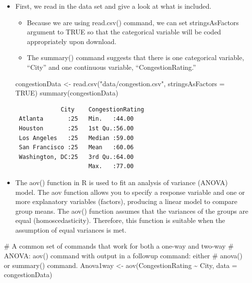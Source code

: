 \documentclass[
  letterpaper,
  DIV=11,
  numbers=noendperiod]{scrreprt}
\newenvironment{Shaded}{\begin{snugshade}}{\end{snugshade}}
\newcommand{\AttributeTok}[1]{\textcolor[rgb]{0.40,0.45,0.13}{#1}}
\newcommand{\CommentTok}[1]{\textcolor[rgb]{0.37,0.37,0.37}{#1}}
\newcommand{\ConstantTok}[1]{\textcolor[rgb]{0.56,0.35,0.01}{#1}}
\newcommand{\FunctionTok}[1]{\textcolor[rgb]{0.28,0.35,0.67}{#1}}
\newcommand{\NormalTok}[1]{\textcolor[rgb]{0.00,0.23,0.31}{#1}}
\newcommand{\OtherTok}[1]{\textcolor[rgb]{0.00,0.23,0.31}{#1}}
\newcommand{\SpecialCharTok}[1]{\textcolor[rgb]{0.37,0.37,0.37}{#1}}
\newcommand{\StringTok}[1]{\textcolor[rgb]{0.13,0.47,0.30}{#1}}
\providecommand{\tightlist}{%
  \setlength{\itemsep}{0pt}\setlength{\parskip}{0pt}}\usepackage{longtable,booktabs,array}
\begin{document}
\begin{itemize}
\item
  First, we read in the data set and give a look at what is included.

  \begin{itemize}
  \tightlist
  \item
    Because we are using read.csv() command, we can set stringsAsFactors
    argument to TRUE so that the categorical variable will be coded
    appropriately upon download.
  \item
    The summary() command suggests that there is one categorical
    variable, ``City'' and one continuous variable,
    ``CongestionRating.''
  \end{itemize}

\begin{Shaded}
\begin{Highlighting}[]
\NormalTok{congestionData }\OtherTok{\textless{}{-}} \FunctionTok{read.csv}\NormalTok{(}\StringTok{"data/congestion.csv"}\NormalTok{, }\AttributeTok{stringsAsFactors =} \ConstantTok{TRUE}\NormalTok{)}
\FunctionTok{summary}\NormalTok{(congestionData)}
\end{Highlighting}
\end{Shaded}

\begin{verbatim}
             City    CongestionRating
 Atlanta       :25   Min.   :44.00   
 Houston       :25   1st Qu.:56.00   
 Los Angeles   :25   Median :59.00   
 San Francisco :25   Mean   :60.06   
 Washington, DC:25   3rd Qu.:64.00   
                     Max.   :77.00   
\end{verbatim}
\item
  The aov() function in R is used to fit an analysis of variance (ANOVA)
  model. The aov function allows you to specify a response variable and
  one or more explanatory variables (factors), producing a linear model
  to compare group means. The aov() function assumes that the variances
  of the groups are equal (homoscedasticity). Therefore, this function
  is suitable when the assumption of equal variances is met.
\end{itemize}

\begin{Shaded}
\begin{Highlighting}[]
\CommentTok{\# A common set of commands that work for both a one{-}way and two{-}way}
\CommentTok{\# ANOVA: aov() command with output in a followup command: either}
\CommentTok{\# anova() or summary() command.}
\NormalTok{Anova1way }\OtherTok{\textless{}{-}} \FunctionTok{aov}\NormalTok{(CongestionRating }\SpecialCharTok{\textasciitilde{}}\NormalTok{ City, }\AttributeTok{data =}\NormalTok{ congestionData)}
\end{Highlighting}
\end{Shaded}
\end{document}
